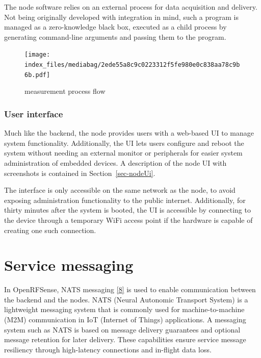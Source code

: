 \documentclass[
  letterpaper,
  a4paper,
  12pt,
  titlepage,
  oneside,
  openany]{book}
\begin{document}
The node software relies on an external process for data acquisition and
delivery. Not being originally developed with integration in mind, such
a program is managed as a zero-knowledge black box, executed as a child
process by generating command-line arguments and passing them to the
program.

\begin{figure}[h!]

{\centering \texttt{[image: index\_files/mediabag/2ede55a8c9c0223312f5fe980e0c838aa78c9b6b.pdf]}

}

\caption{measurement process flow}

\end{figure}

\hypertarget{user-interface}{%
\subsection{User interface}\label{user-interface}}

Much like the backend, the node provides users with a web-based UI to
manage system functionality. Additionally, the UI lets users configure
and reboot the system without needing an external monitor or peripherals
for easier system administration of embedded devices. A description of
the node UI with screenshots is contained in Section~\ref{sec-nodeUi}.

The interface is only accessible on the same network as the node, to
avoid exposing administration functionality to the public internet.
Additionally, for thirty minutes after the system is booted, the UI is
accessible by connecting to the device through a temporary WiFi access
point if the hardware is capable of creating one such connection.


\hypertarget{sec-serviceMessaging}{%
\chapter{Service messaging}\label{sec-serviceMessaging}}

In OpenRFSense, NATS messaging \protect\hyperlink{ref-NATS}{{[}8{]}} is
used to enable communication between the backend and the nodes. NATS
(Neural Autonomic Transport System) is a lightweight messaging system
that is commonly used for machine-to-machine (M2M) communication in IoT
(Internet of Things) applications. A messaging system such as NATS is
based on message delivery guarantees and optional message retention for
later delivery. These capabilities ensure service message resiliency
through high-latency connections and in-flight data loss.
\end{document}

